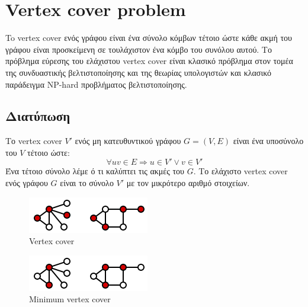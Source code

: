 \chapter{Vertex cover problem} %

\label{Chapter2} %
\justify
To vertex cover ενός γράφου είναι ένα σύνολο κόμβων τέτοιο ώστε κάθε ακμή του γράφου είναι προσκείμενη σε τουλάχιστον ένα κόμβο του συνόλου αυτού. Το πρόβλημα εύρεσης του ελάχιστου vertex cover είναι κλασικό πρόβλημα στον τομέα της συνδυαστικής βελτιστοποίησης και της θεωρίας υπολογιστών και κλασικό παράδειγμα NP-hard προβλήματος βελτιστοποίησης. 

\section{Διατύπωση}
Το vertex cover $V'$ ενός μη κατευθυντικού γράφου $G=(V,E)$ είναι ένα υποσύνολο του $V$ τέτοιο ώστε:
$$\forall uv \in{E} \Rightarrow u \in{V'} \lor v \in{V'}$$
Ένα τέτοιο σύνολο λέμε ό τι καλύπτει τις ακμές του $G$. Το ελάχιστο vertex cover ενός γράφου $G$ είναι το σύνολο $V'$ με τον μικρότερο αριθμό στοιχείων.


\begin{figure}[H]
\caption{Vertex cover}
\centering
\includegraphics{Figures/vert_cover.png}\centering
\end{figure}

\begin{figure}[H]
\caption{Minimum vertex cover}
\centering
\includegraphics{Figures/min_vert_cover.png}\centering
\end{figure}


